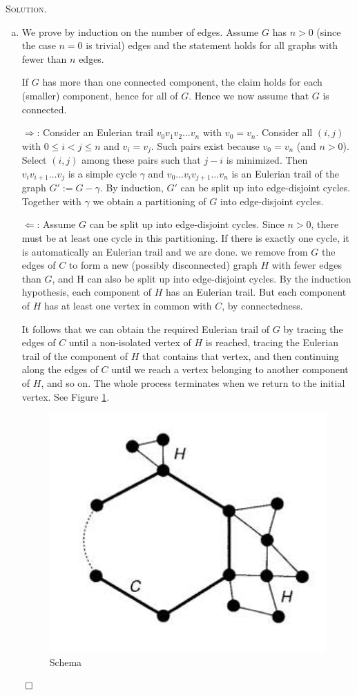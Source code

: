 \documentclass[12pt, a4paper, oneside]{ctexart}
\newenvironment{solution}{%
	\par\noindent\textsc{Solution. }\ignorespaces
}{%
	\hfill$\qed$\par
}
\begin{document}
	\begin{solution}
		\begin{enumerate}[(a)]
			\item  We prove by induction on the number of edges.  Assume $G$ has $n > 0$ (since the case $n = 0$ is trivial) edges and the statement holds
			for all graphs with fewer than $n$ edges.

			If $G$ has more than one connected component, the claim holds for each (smaller) component,
			hence for all of $G$. Hence we now assume that $G$ is connected. 

			$\Rightarrow$: Consider an Eulerian trail $v_0 v_1 v_2 \dots v_n$ with $v_0 = v_n$. Consider all $(i, j)$ with $0 \leq i < j \leq n$ and
			$v_i = v_j$. Such pairs exist because $v_0 = v_n$ (and $n > 0$). Select $(i, j)$ among these pairs such that
			$j - i$ is minimized. Then $v_i v_{i+1} \dots v_j$ is a simple cycle $\gamma$ and $v_0 \dots v_i v_{j+1} \dots v_n$ is an Eulerian trail
			of the graph $G' := G - \gamma$. By induction, $G'$ can be split up into edge-disjoint cycles. Together with
			$\gamma$ we obtain a partitioning of $G$ into edge-disjoint cycles.

			$\Leftarrow$: Assume $G$ can be split up into edge-disjoint cycles. Since $n > 0$, there must be at least one cycle
			in this partitioning. If there is exactly one cycle, it is automatically an Eulerian trail and we are done.
			we remove from $G$ the edges of $C$ to form a new (possibly disconnected) graph $H$ with fewer edges than $G$, and H can also be split
			up into edge-disjoint cycles. By the induction hypothesis, each
			component of $H$ has an Eulerian trail. But each component of $H$ has at least one vertex in common with $C$, by connectedness. 
			
			It follows that we can obtain the required
			Eulerian trail of $G$ by tracing the edges of $C$ until a non-isolated vertex of $H$ is
			reached, tracing the Eulerian trail of the component of $H$ that contains that vertex, and
			then continuing along the edges of $C$ until we reach a vertex belonging to another
			component of $H$, and so on. The whole process terminates when we return to the
			initial vertex. See Figure \ref{fig:Schema}.

			\begin{figure}[H]
				\small
				\centering
				\includegraphics[width=0.45\columnwidth]{figure/fig3.png}
				\caption{Schema}
				\label{fig:Schema}
			\end{figure}


\end{enumerate}
\end{solution}
\end{document}
